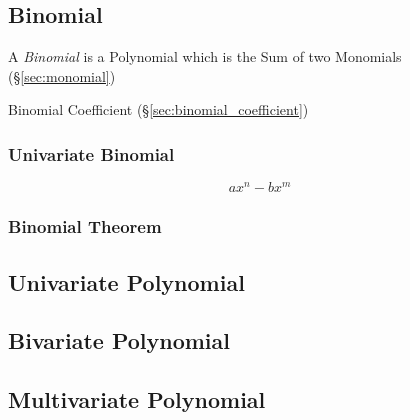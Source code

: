 \subsection{Binomial}\label{sec:binomial}

A \emph{Binomial} is a Polynomial which is the Sum of two Monomials
(\S\ref{sec:monomial})

Binomial Coefficient (\S\ref{sec:binomial_coefficient})



\subsubsection{Univariate Binomial}\label{sec:univariate_binomial}

\[
  a x^n - b x^m
\]


\subsubsection{Binomial Theorem}\label{sec:binomial_theorem}



\subsection{Univariate Polynomial}\label{sec:univariate_polynomial}

\subsection{Bivariate Polynomial}\label{sec:bivariate_polynomial}

\subsection{Multivariate Polynomial}\label{sec:multivariate_polynomial}

